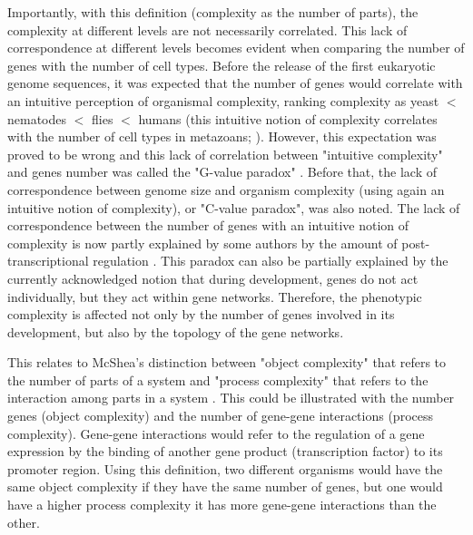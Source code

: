 Importantly, with this definition (complexity as the number of parts), the complexity at different levels are not necessarily correlated.
%
This lack of correspondence at different levels becomes evident when comparing the number of genes with the number of cell types. Before the release of the first eukaryotic genome sequences, it was expected that the number of genes would correlate with an intuitive perception of organismal complexity, ranking complexity as yeast $<$ nematodes $<$ flies $<$ humans \citep{Hahn2002} (this intuitive notion of complexity correlates with the number of cell types in metazoans; \citealp{Valentine1994}). However, this expectation was proved to be wrong and this lack of correlation between "intuitive complexity" and genes number was called the "G-value paradox" \citep{Hahn2002}.
Before that, the lack of correspondence between genome size and organism complexity (using again an intuitive notion of complexity),  or "C-value paradox", was also noted.
The lack of correspondence between the number of genes with an intuitive notion of complexity is now partly explained by some authors by the amount of post-transcriptional regulation \citep{Sempere2006}.
This paradox can also be partially explained by the currently acknowledged notion that during development, genes do not act individually, but they act within gene networks. Therefore, the phenotypic complexity is affected not only by the number of genes involved in its development, but also by the topology of the gene networks.

This relates to McShea's distinction between "object complexity" that refers to the number of parts of a system and "process complexity" that refers to the interaction among parts in a system \citep{McShea1996}.
This could be illustrated with the number genes (object complexity) and the number of gene-gene interactions (process complexity). Gene-gene interactions would refer to the regulation of a gene expression by the binding of another gene product (transcription factor) to its promoter region.
Using this definition, two different organisms would have the same object complexity if they have the same number of genes, but one would have a higher process complexity it has more gene-gene interactions than the other.


